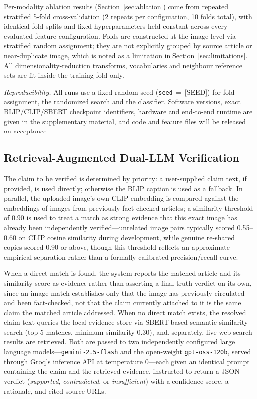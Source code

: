 \documentclass[conference,a4paper]{IEEEtran}
\newcommand{\llmProprietary}{gemini-2.5-flash}
\newcommand{\llmOpen}{gpt-oss-120b}
\begin{document}
Per-modality ablation results (Section~\ref{sec:ablation}) come from repeated
stratified 5-fold cross-validation (2 repeats per configuration, 10 folds
total), with identical fold splits and fixed hyperparameters held constant
across every evaluated feature configuration. Folds are constructed at the
image level via stratified random assignment; they are not explicitly grouped
by source article or near-duplicate image, which is noted as a limitation in
Section~\ref{sec:limitations}. All dimensionality-reduction transforms,
vocabularies and neighbour reference sets are fit inside the training fold
only.

\emph{Reproducibility.} All runs use a fixed random seed
(\texttt{seed}~=~[SEED]) for fold assignment, the randomized search and the
classifier. Software versions, exact BLIP/CLIP/SBERT checkpoint identifiers,
hardware and end-to-end runtime are given in the supplementary material, and
code and feature files will be released on acceptance.

\subsection{Retrieval-Augmented Dual-LLM Verification}
\label{sec:verify}

The claim to be verified is determined by priority: a user-supplied claim
text, if provided, is used directly; otherwise the BLIP caption is used as a
fallback. In parallel, the uploaded image's own CLIP embedding is compared
against the embeddings of images from previously fact-checked articles; a
similarity threshold of 0.90 is used to treat a match as strong evidence that
this exact image has already been independently verified---unrelated image
pairs typically scored 0.55--0.60 on CLIP cosine similarity during
development, while genuine re-shared copies scored 0.90 or above, though this
threshold reflects an approximate empirical separation rather than a formally
calibrated precision/recall curve.

When a direct match is found, the system reports the matched article and its
similarity score as evidence rather than asserting a final truth verdict on
its own, since an image match establishes only that the image has previously
circulated and been fact-checked, not that the claim currently attached to it
is the same claim the matched article addressed. When no direct match exists,
the resolved claim text queries the local evidence store via SBERT-based
semantic similarity search (top-5 matches, minimum similarity 0.30), and,
separately, live web-search results are retrieved. Both are passed to two
independently configured large language models---\texttt{\llmProprietary} and
the open-weight \texttt{\llmOpen}, served through Groq's inference API at
temperature 0---each given an identical prompt containing the claim and the
retrieved evidence, instructed to return a JSON verdict (\emph{supported},
\emph{contradicted}, or \emph{insufficient}) with a confidence score, a
rationale, and cited source URLs.
\end{document}
